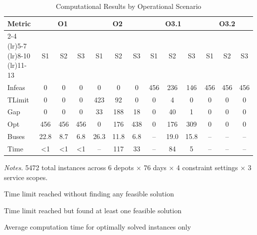 \begin{table}[ht]
\centering
\caption{Computational Results by Operational Scenario}
\label{tab:computational_results}
\begin{threeparttable}
\begin{tabular}{lcccccccccccc}
\toprule
Metric & \multicolumn{3}{c}{O1} & \multicolumn{3}{c}{O2} & \multicolumn{3}{c}{O3.1} & \multicolumn{3}{c}{O3.2} \\
\cmidrule(lr){2-4} \cmidrule(lr){5-7} \cmidrule(lr){8-10} \cmidrule(lr){11-13}
  & S1 & S2 & S3 & S1 & S2 & S3 & S1 & S2 & S3 & S1 & S2 & S3 \\
\midrule
Infeas & 0 & 0 & 0 & 0 & 0 & 0 & 456 & 236 & 146 & 456 & 456 & 456 \\
TLimit\tnote{a} & 0 & 0 & 0 & 423 & 92 & 0 & 0 & 4 & 0 & 0 & 0 & 0 \\
Gap\tnote{b} & 0 & 0 & 0 & 33 & 188 & 18 & 0 & 40 & 1 & 0 & 0 & 0 \\
Opt & 456 & 456 & 456 & 0 & 176 & 438 & 0 & 176 & 309 & 0 & 0 & 0 \\
Buses & 22.8 & 8.7 & 6.8 & 26.3 & 11.8 & 6.8 & -- & 19.0 & 15.8 & -- & -- & -- \\
Time\tnote{c} & {<}1 & {<}1 & {<}1 & -- & 117 & 33 & -- & 84 & 5 & -- & -- & -- \\
\bottomrule
\end{tabular}
\begin{tablenotes}
      \smaller
      \item \textit{Notes.} 5472 total instances across 6 depots × 76 days × 4 constraint settings × 3 service scopes.
      \item[a] Time limit reached without finding any feasible solution
      \item[b] Time limit reached but found at least one feasible solution
      \item[c] Average computation time for optimally solved instances only
\end{tablenotes}
\end{threeparttable}
\end{table}
